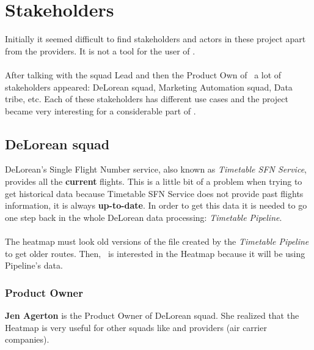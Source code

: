 
\chapter{Stakeholders}

\label{chapter04}


Initially it seemed difficult to find stakeholders and actors in these project apart from the providers. It is not a tool for the user of \company.
\\\\
After talking with the squad Lead and then the Product Own of \squad\ a lot of stakeholders appeared: DeLorean squad, Marketing Automation squad, Data tribe, etc. Each of these stakeholders has different use cases and the project became very interesting for a considerable part of \company.

\section{DeLorean squad} \label{dlr}

DeLorean's Single Flight Number service, also known as \textit{Timetable SFN Service}, provides all the \textbf{current} flights. This is a little bit of a problem when trying to get historical data because Timetable SFN Service does not provide past flights information, it is always \textbf{up-to-date}. In order to get this data it is needed to go one step back in the whole DeLorean data processing: \textit{Timetable Pipeline}.
\\\\
The heatmap must look old versions of the file created by the \textit{Timetable Pipeline} to get older routes. Then, \squad\ is interested in the Heatmap because it will be using Pipeline's data.

\subsection*{Product Owner} \label{product_owner}

\textbf{Jen Agerton} is the Product Owner of DeLorean squad. She realized that the Heatmap is very useful for other squads like  and providers (air carrier companies).

